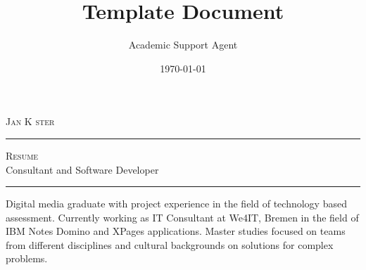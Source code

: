 \documentclass{article}
\title{Template Document}
\author{Academic Support Agent}
\date{\today}
\begin{document}
\maketitle

\pagestyle{fancy}	








\vspace{-8pt}
\begin{center}
	\HUGE \textsc{Jan K ster} \textcolor{sectcol}{\rule[-1mm]{1mm}{0.9cm}} \textsc{Resume}\\[2pt]
	\small Consultant and Software Developer
\end{center}



\vspace{6pt}


\vspace{-2pt}
\textcolor{softcol}{\hrule}
\vspace{6pt}

\normalsize

\vspace{-6pt}
Digital media graduate with project experience in the field of technology based assessment. Currently working as IT Consultant at We4IT, Bremen in the field of IBM Notes Domino and XPages applications. Master studies focused on teams from different disciplines and cultural backgrounds on solutions for complex problems.\\
\end{document}
